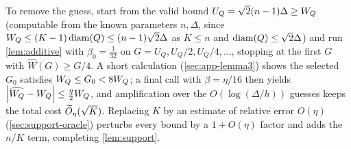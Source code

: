 To remove the guess, start from the valid bound $U_Q=\sqrt2(n-1)\Delta\ge W_Q$ (computable from the known parameters $n,\Delta$,
since $W_Q\le(K-1)\operatorname{diam}(Q)\le(n-1)\sqrt2\Delta$ as $K\le n$ and $\operatorname{diam}(Q)\le\sqrt2\Delta$) and run
\cref{lem:additive} with
$\beta_0=\tfrac1{32}$ on $G=U_Q,U_Q/2,U_Q/4,\dots$, stopping at the first $G$ with $\widehat W(G)\ge G/4$.
A short calculation (\cref{sec:app-lemma3}) shows the selected $G_0$ satisfies $W_Q\le G_0<8W_Q$; a final
call with $\beta=\eta/16$ then yields $\left|\widehat{W_Q}-W_Q\right|\le\tfrac\eta2W_Q$, and amplification over the
$O(\log(\Delta/h))$ guesses keeps the total cost $\widetilde{O}_\eta(\sqrt K)$. Replacing $K$ by an estimate of
relative error $O(\eta)$ (\cref{sec:support-oracle}) perturbs every bound by a $1+O(\eta)$ factor and adds
the $n/K$ term, completing \cref{lem:support}.
